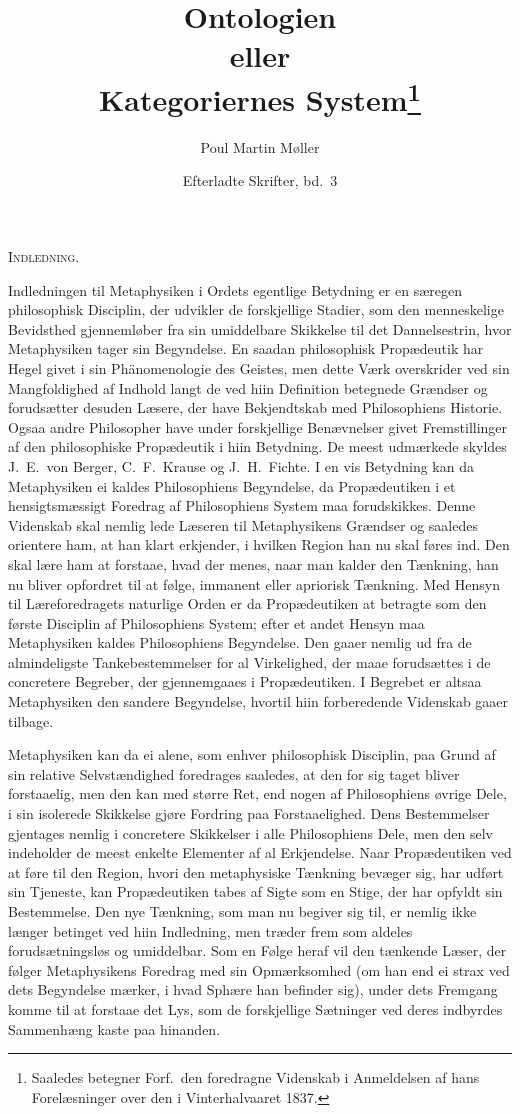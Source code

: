\documentclass[12pt]{article}
\title{\textbf{Ontologien}\\[0.3em]
  \large eller\\[0.3em]
  \textbf{Kategoriernes System}\footnote{Saaledes betegner Forf.\ den
  foredragne Videnskab i Anmeldelsen af hans Forelæsninger over den i
  Vinterhalvaaret 1837.}}
\author{Poul Martin Møller}
\date{Efterladte Skrifter, bd.\ 3}
\newcommand{\opage}[1]{\marginnote{\footnotesize\textit{[#1]}}}
\begin{document}
\maketitle

\begin{center}\textsc{Indledning.}\end{center}

\opage{189}Indledningen til Metaphysiken i Ordets egentlige Betydning er en
særegen philosophisk Disciplin, der udvikler de forskjellige Stadier, som den
menneskelige Bevidsthed gjennemløber fra sin umiddelbare Skikkelse til det
Dannelsestrin, hvor Metaphysiken tager sin Begyndelse. En saadan philosophisk
Propædeutik har Hegel givet i sin Phänomenologie des Geistes, men dette Værk
overskrider ved sin Mangfoldighed af Indhold langt de ved hiin Definition
betegnede Grændser og forudsætter desuden Læsere, der have Bekjendtskab med
Philosophiens Historie. Ogsaa andre Philosopher have under forskjellige
Benævnelser givet Fremstillinger af den philosophiske Propædeutik i hiin
Betydning. De meest udmærkede skyldes J.\ E.\ von Berger, C.\ F.\ Krause og
J.\ H.\ Fichte. I en vis Betydning kan da Metaphysiken ei kaldes Philosophiens
Begyndelse, da Propædeutiken i et hensigtsmæssigt Foredrag af Philosophiens
System maa forudskikkes. Denne Viden\opage{190}skab skal nemlig lede Læseren
til Metaphysikens Grændser og saaledes orientere ham, at han klart erkjender, i
hvilken Region han nu skal føres ind. Den skal lære ham at forstaae, hvad der
menes, naar man kalder den Tænkning, han nu bliver opfordret til at følge,
immanent eller apriorisk Tænkning. Med Hensyn til Læreforedragets naturlige
Orden er da Propædeutiken at betragte som den første Disciplin af Philosophiens
System; efter et andet Hensyn maa Metaphysiken kaldes Philosophiens Begyndelse.
Den gaaer nemlig ud fra de almindeligste Tankebestemmelser for al Virkelighed,
der maae forudsættes i de concretere Begreber, der gjennemgaaes i
Propædeutiken. I Begrebet er altsaa Metaphysiken den sandere Begyndelse, hvortil
hiin forberedende Videnskab gaaer tilbage.

Metaphysiken kan da ei alene, som enhver philosophisk Disciplin, paa Grund af
sin relative Selvstændighed foredrages saaledes, at den for sig taget bliver
forstaaelig, men den kan med større Ret, end nogen af Philosophiens øvrige Dele,
i sin isolerede Skikkelse gjøre Fordring paa Forstaaelighed. Dens Bestemmelser
gjentages nemlig i concretere Skikkelser i alle Philosophiens Dele, men den selv
indeholder de meest enkelte Elementer af al Erkjendelse. Naar Propædeutiken ved
at føre til den Region, hvori den metaphysiske Tænkning bevæger sig, har udført
sin Tjeneste, kan Propædeutiken tabes af Sigte som en Stige, der har opfyldt sin
Bestemmelse. Den nye Tænkning, som man nu begiver sig til, er nemlig ikke længer
betinget ved hiin Indledning, men træder frem som aldeles forudsætningsløs og
umiddelbar. Som en Følge heraf vil den tænkende Læser, der følger Metaphysikens
Foredrag med sin Opmærksomhed (om han end ei strax ved dets Begyndelse mærker, i
hvad Sphære han befinder sig), under dets Fremgang komme til at forstaae det
Lys, som de forskjellige Sætninger ved deres indbyrdes Sammenhæng kaste paa
hinanden.
\end{document}
